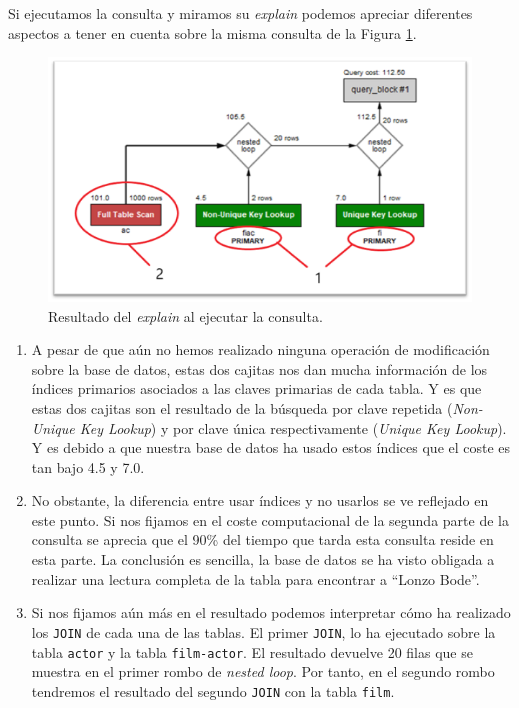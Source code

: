 \documentclass[a4paper]{article}
\begin{document}
Si ejecutamos la consulta y miramos su \emph{explain} podemos apreciar diferentes aspectos a tener en cuenta sobre la misma consulta de la Figura \ref{fig:ejecucion1}.

\begin{figure}[ht]
    \centering
    \includegraphics[width=0.8\columnwidth]{figs/ejecucion1.png}
    \caption{Resultado del \emph{explain} al ejecutar la consulta.}\label{fig:ejecucion1}
\end{figure}

\begin{enumerate}
    \item A pesar de que aún no hemos realizado ninguna operación de modificación sobre la base de datos, estas dos cajitas nos dan mucha información de los índices primarios asociados a las claves primarias de cada tabla. Y es que estas dos cajitas son el resultado de la búsqueda por clave repetida (\emph{Non-Unique Key Lookup}) y por clave única respectivamente (\emph{Unique Key Lookup}). Y es debido a que nuestra base de datos ha usado estos índices que el coste es tan bajo 4.5 y 7.0.
    \item No obstante, la diferencia entre usar índices y no usarlos se ve reflejado en este punto. Si nos fijamos en el coste computacional de la segunda parte de la consulta se aprecia que el 90\% del tiempo que tarda esta consulta reside en esta parte. La conclusión es sencilla, la base de datos se ha visto obligada a realizar una lectura completa de la tabla para encontrar a ``Lonzo Bode''.
    \item Si nos fijamos aún más en el resultado podemos interpretar cómo ha realizado los \texttt{JOIN} de cada una de las tablas. El primer \texttt{JOIN}, lo ha ejecutado sobre la tabla \texttt{actor} y la tabla \texttt{film-actor}. El resultado devuelve 20 filas que se muestra en el primer rombo de \emph{nested loop}. Por tanto, en el segundo rombo tendremos el resultado del segundo  \texttt{JOIN} con la tabla \texttt{film}.
\end{enumerate}
\end{document}
